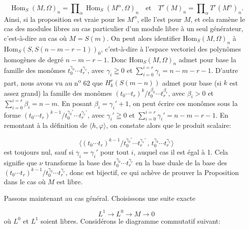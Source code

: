 \begin{equation*}
\operatorname{Hom}_S(M, \Omega)_n = \prod\nolimits_\alpha \operatorname{Hom}_S(M^\alpha, \Omega)_n \quad \text{et} \quad T^r(M)_n = \prod\nolimits_\alpha T^r(M^\alpha)_n .
\end{equation*}
Ainsi, si la proposition est vraie pour les $M^\alpha$, elle l'est pour $M$, et cela ramène le cas des modules libres au cas particulier d'un module libre à un seul générateur,
c'est-à-dire au cas où $M = S(m)$. On peut alors identifier $\mathrm{Hom}_S(M, \Omega)_n$ à $\mathrm{Hom}_S(S, S(n - m - r - 1))_0$, c'est-à-dire à l'espace vectoriel des polynômes homogènes de degré $n - m - r - 1$. Donc $\mathrm{Hom}_S(M, \Omega)_n$ admet pour base la famille des monômes $t_0^{\gamma_0} \cdots t_r^{\gamma_r}$, avec $\gamma_i \geqq 0$ et $\sum_{i=0}^{i=r} \gamma_i = n - m - r - 1$. D'autre part, nous avons vu au n\textsuperscript{o} 62 que $H_k^r(S(m - n))$ admet pour base (si $k$ est assez grand) la famille des monômes $(t_0 \cdots t_r)^k/t_0^{\beta_0} \cdots t_r^{\beta_r}$, avec $\beta_i > 0$ et $\sum_{i=0}^{i=r} \beta_i = n - m$. En posant $\beta_i = \gamma_i' + 1$, on peut écrire ces monômes sous la forme $(t_0 \cdots t_r)^{k-1}/t_0^{\gamma_0'} \cdots t_r^{\gamma_r'}$, avec $\gamma_i' \geqq 0$ et $\sum_{i=0}^{i=r} \gamma_i' = n - m - r - 1$. En remontant à la définition de $\langle h, \varphi \rangle$, on constate alors que le produit scalaire:

\begin{equation*}
\langle (t_0 \cdots t_r)^{k-1}/t_0^{\gamma_0'} \cdots t_r^{\gamma_r'} \, , \, t_0^{\gamma_0} \cdots t_r^{\gamma_r} \rangle
\end{equation*}
est toujours nul, sauf si $\gamma_i = \gamma_i'$ pour tout $i$, auquel cas il est égal à 1. Cela signifie que $\nu$ transforme la base des $t_0^{\gamma_0} \cdots t_r^{\gamma_r}$ en la base duale de la base des $(t_0 \cdots t_r)^{k-1}/t_0^{\gamma_0} \cdots t_r^{\gamma_r}$, donc est bijectif, ce qui achève de prouver la Proposition dans le cas où $M$ est libre.

Passons maintenant au cas général. Choisissons une suite exacte

\begin{equation*}
L^1 \to L^0 \to M \to 0
\end{equation*}
où $L^0$ et $L^1$ soient libres. Considérons le diagramme commutatif suivant:

